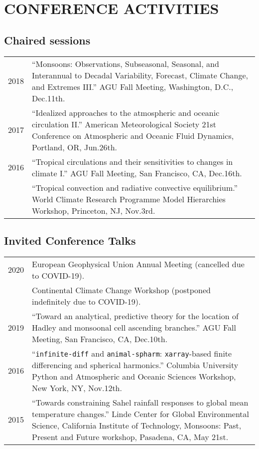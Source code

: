 \documentclass[letterpaper,11pt]{shillcv}
\begin{document}
\section*{CONFERENCE ACTIVITIES}
\subsection*{Chaired sessions}
\begin{longtable}{@{} Y{0.05\textwidth} L{0.95\textwidth} @{}}
2018 & ``Monsoons: Observations, Subseasonal, Seasonal, and Interannual to Decadal Variability, Forecast, Climate Change, and Extremes III.''  AGU Fall Meeting, Washington, D.C., Dec.\@ 11th. \\
2017 & ``Idealized approaches to the atmospheric and oceanic circulation II.'' American Meteorological Society 21st Conference on Atmospheric and Oceanic Fluid Dynamics, Portland, OR, Jun.\@ 26th.\\
2016 & ``Tropical circulations and their sensitivities to changes in climate I.''  AGU Fall Meeting, San Francisco, CA, Dec.\@ 16th.\\
     & ``Tropical convection and radiative convective equilibrium.''  World Climate Research Programme Model Hierarchies Workshop, Princeton, NJ, Nov.\@ 3rd.\\
\end{longtable}

\subsection*{Invited Conference Talks}
\begin{longtable}{@{} Y{0.05\textwidth} L{0.95\textwidth} @{}}
2020 & European Geophysical Union Annual Meeting (cancelled due to COVID-19).\\
     & Continental Climate Change Workshop (postponed indefinitely due to COVID-19).\\
2019 & ``Toward an analytical, predictive theory for the location of Hadley and monsoonal cell ascending branches.''  AGU Fall Meeting, San Francisco, CA, Dec.\@ 10th.\\
2016 & ``\texttt{infinite-diff} and \texttt{animal-spharm}: \texttt{xarray}-based finite differencing and spherical harmonics.''  Columbia University Python and Atmospheric and Oceanic Sciences Workshop, New York, NY, Nov.\@ 12th.\\
2015 & ``Towards constraining Sahel rainfall responses to global mean temperature changes.''   Linde Center for Global Environmental Science, California Institute of Technology, Monsoons: Past, Present and Future workshop, Pasadena, CA, May 21st.\\
\end{longtable}
\end{document}
